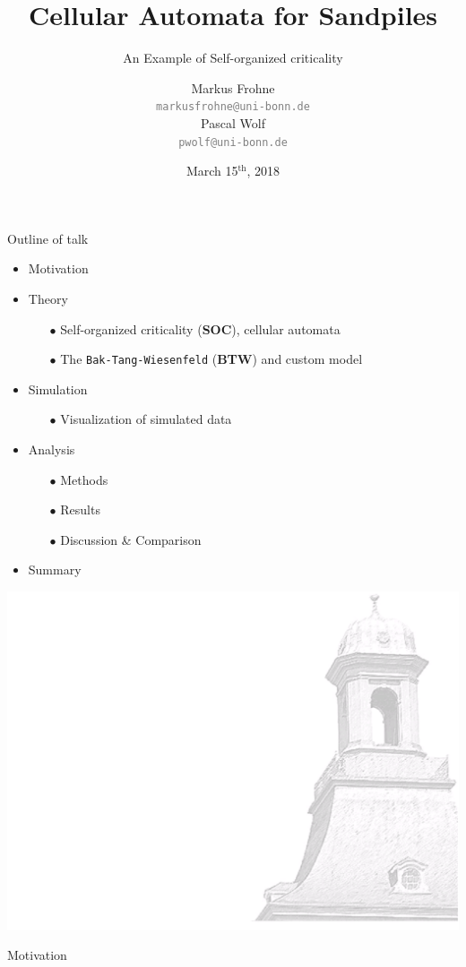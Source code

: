 \documentclass[xcolor=dvipsnames]{beamer}
\title[Sandpiles]{Cellular Automata for Sandpiles}
\subtitle{An Example of Self-organized criticality}
\author[M. Frohne \& P. Wolf]{Markus Frohne\\ \texttt{\textcolor{gray}{markusfrohne@uni-bonn.de}}\\ \vspace{0.33cm} Pascal Wolf\\ \texttt{\textcolor{gray}{pwolf@uni-bonn.de}}}
\date{March 15$^\text{th}$, 2018}
\newcommand{\myitemsep}{\setlength\itemsep{0.33cm}}
\newcommand{\mysubitemsep}{\setlength\itemsep{0.22cm}}
\begin{document}
	
	\begin{frame}
		\titlepage
	\end{frame}
	
	\begin{frame}{Outline of talk}
		\begin{itemize}
			\myitemsep
			\item Motivation
			\item {Theory
				\vspace{0.22cm}
				\begin{itemize}
					\mysubitemsep
					\item[$\bullet$] Self-organized criticality (\textbf{SOC}), cellular automata
					\item[$\bullet$] The \texttt{Bak-Tang-Wiesenfeld} (\textbf{BTW}) and custom model
				\end{itemize}}
			\item {Simulation
				\vspace{0.22cm}
				\begin{itemize}
					\mysubitemsep
					\item[$\bullet$] Visualization of simulated data
				\end{itemize}}
			\item {Analysis 
				\vspace{0.22cm}
				\begin{itemize}
					\mysubitemsep
					\item[$\bullet$] Methods
					\item[$\bullet$] Results
					\item[$\bullet$] Discussion \& Comparison
				\end{itemize}}
			\item Summary
		\end{itemize}
	\end{frame}
	
	{\usebackgroundtemplate%
		{%
			\includegraphics[width=\paperwidth,height=\paperheight]{bkg1.pdf}%
		}
		\begin{frame}
			\centering \Huge \color{ublue} Motivation
			\thispagestyle{empty}
			\addtocounter{framenumber}{-1}
		\end{frame}
	}
	
\end{document}
